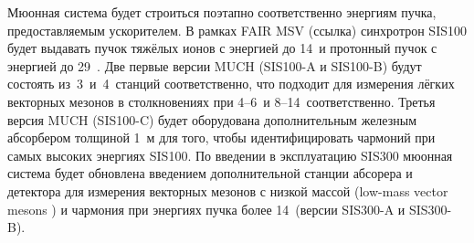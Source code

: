 
Мюонная система будет строиться поэтапно соответственно энергиям пучка, предоставляемым ускорителем. В рамках FAIR MSV (\todo ссылка) синхротрон SIS100 будет выдавать пучок тяжёлых ионов с энергией до 14~\GeVperNucl и протонный пучок с энергией до 29~\GeVperNucl. Две первые версии MUCH (SIS100-A и SIS100-B) будут состоять из~3~и~4~станций соответственно, что подходит для измерения лёгких векторных мезонов в столкновениях при 4--6~\GeVperNucl и 8--14~\GeVperNucl соответственно. Третья версия MUCH (SIS100-C) будет оборудована дополнительным железным абсорбером толщиной 1~м для того, чтобы идентифицировать чармоний при самых высоких энергиях SIS100. 
По введении в эксплуатацию SIS300 мюонная система будет обновлена введением дополнительной станции абсорера и детектора для измерения векторных мезонов с низкой массой (low-mass vector mesons \todo) и чармония при энергиях пучка более 14~\GeVperNucl (версии SIS300-A и SIS300-B).


